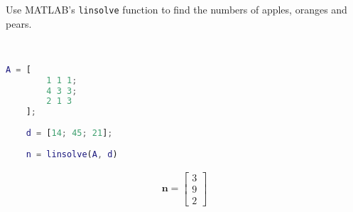 Use MATLAB’s \texttt{linsolve} function to find the numbers of apples, oranges and pears.

\begin{solution} \
    \begin{lstlisting}[language=Matlab]
    A = [
        1 1 1;
        4 3 3;
        2 1 3
    ];
    
    d = [14; 45; 21];
    
    n = linsolve(A, d)
    \end{lstlisting}
    
    \begin{align*}
        \boldsymbol{n} = \begin{bmatrix}
            3 \\ 9 \\ 2
        \end{bmatrix}
    \end{align*}
\end{solution}
